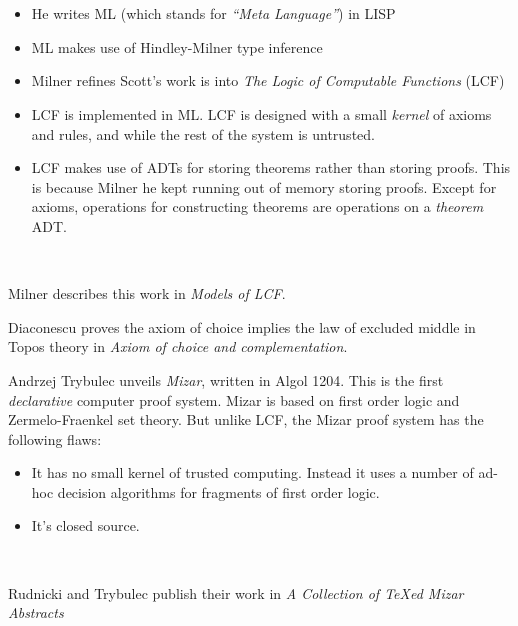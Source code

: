 \documentclass{beamer}
\begin{document}
\begin{frame}[allowframebreaks]{\insertsectionhead\ \textemdash\
    \insertsubsectionhead}
\begin{description}
    \

     \begin{itemize}
     \item He writes ML (which stands for \emph{``Meta Language''}) in LISP
     \item ML makes use of Hindley-Milner type inference
     \item Milner refines Scott's work is into \emph{The Logic of Computable Functions} (LCF)
       \item LCF is implemented in ML.  LCF is designed with a small \emph{kernel} of axioms and rules, and while the rest of the system is untrusted.
       \item LCF makes use of ADTs for storing theorems rather than
         storing proofs.  This is because Milner he kept running out
         of memory storing proofs. Except for axioms, operations
         for constructing theorems are operations on a
         \emph{theorem} ADT.
     \end{itemize}

     \

 Milner describes this work in \emph{Models of LCF}.
  \item[1975] Diaconescu proves the axiom of choice implies the law of excluded middle in Topos theory in \emph{Axiom of choice and complementation}.
  \item[1975] Andrzej Trybulec unveils \emph{Mizar}, written in Algol
    1204. This is the first \emph{declarative} computer proof system.
    Mizar is based on first order logic and Zermelo-Fraenkel set
    theory. But unlike LCF, the Mizar proof system has the following flaws:
    \begin{itemize}
    \item It has no small kernel of trusted computing. Instead it uses a number of ad-hoc decision algorithms for fragments of first order logic.
    \item It's closed source.
    \end{itemize}

    \

    Rudnicki and Trybulec publish their work in \emph{A Collection of {\TeX}ed Mizar Abstracts}


\end{description}
\end{frame}
\end{document}
